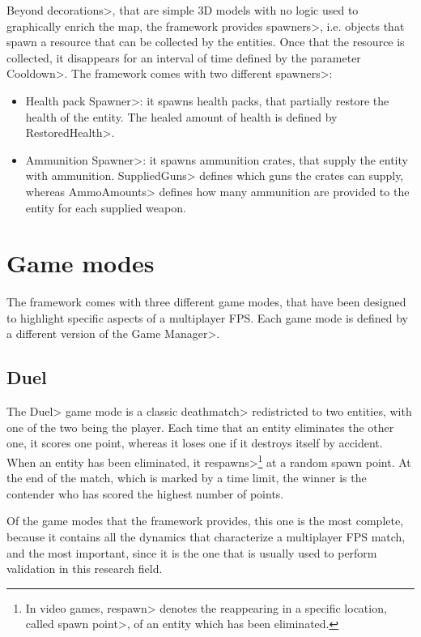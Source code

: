 Beyond \<decorations>, that are simple 3D models with no logic used to graphically enrich the map, the framework provides \<spawners>, i.e. objects that spawn a resource that can be collected by the entities. Once that the resource is collected, it disappears for an interval  of time defined by the parameter \<Cooldown>. The framework comes with two different \<spawners>:

\begin{itemize}
\item \<Health pack Spawner>: it spawns health packs, that partially restore the health of the entity. The healed amount of health is defined by \<RestoredHealth>.
\item \<Ammunition Spawner>: it spawns ammunition crates, that supply the entity with ammunition. \<SuppliedGuns> defines which guns the crates can supply, whereas \<AmmoAmounts> defines how many ammunition are provided to the entity for each supplied weapon.

\end{itemize}


\section{Game modes}

The framework comes with three different game modes, that have been designed to highlight specific aspects of a multiplayer FPS. Each game mode is defined by a different version of the \<Game Manager>.

\subsection{Duel}

The \<Duel> game mode is a classic \<deathmatch> redistricted to two entities, with one of the two being the player. Each time that an entity eliminates the other one, it scores one point, whereas it loses one if it destroys itself by accident. When an entity has been eliminated, it \<respawns>\footnote{In video games, \<respawn> denotes the reappearing in a specific location, called \<spawn point>, of an entity which has been eliminated.} at a random spawn point. At the end of the match, which is marked by a time limit, the winner is the contender who has scored the highest number of points.

\par

Of the game modes that the framework provides, this one is the most complete, because it contains all the dynamics that characterize a multiplayer FPS match, and the most important, since it is the one that is usually used to perform validation in this research field.

